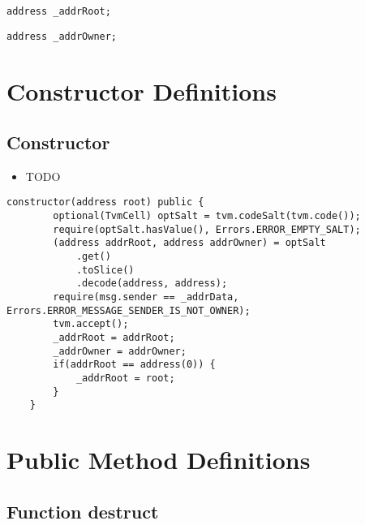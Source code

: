 \begin{lstlisting}[firstnumber=11]
    address _addrRoot;
\end{lstlisting}

\begin{lstlisting}[firstnumber=12]
    address _addrOwner;
\end{lstlisting}

\section{Constructor Definitions}


\subsection{Constructor}

\begin{itemize}
\item TODO
\end{itemize}

\begin{lstlisting}[firstnumber=15]
    constructor(address root) public {
        optional(TvmCell) optSalt = tvm.codeSalt(tvm.code());
        require(optSalt.hasValue(), Errors.ERROR_EMPTY_SALT);
        (address addrRoot, address addrOwner) = optSalt
            .get()
            .toSlice()
            .decode(address, address);
        require(msg.sender == _addrData, Errors.ERROR_MESSAGE_SENDER_IS_NOT_OWNER);
        tvm.accept();
        _addrRoot = addrRoot;
        _addrOwner = addrOwner;
        if(addrRoot == address(0)) {
            _addrRoot = root;
        }
    }
\end{lstlisting}

\section{Public Method Definitions}


\subsection{Function destruct}

